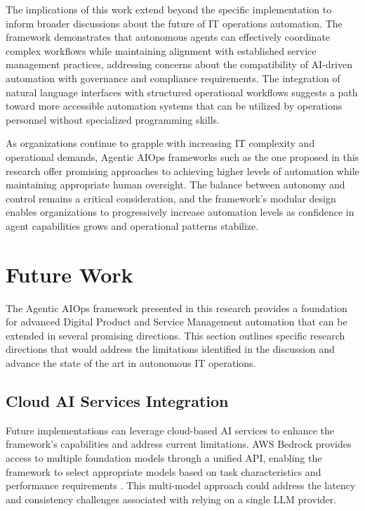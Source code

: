 \documentclass{article}
\begin{document}
The implications of this work extend beyond the specific implementation to inform broader discussions about the future of IT operations automation. The framework demonstrates that autonomous agents can effectively coordinate complex workflows while maintaining alignment with established service management practices, addressing concerns about the compatibility of AI-driven automation with governance and compliance requirements. The integration of natural language interfaces with structured operational workflows suggests a path toward more accessible automation systems that can be utilized by operations personnel without specialized programming skills.

As organizations continue to grapple with increasing IT complexity and operational demands, Agentic AIOps frameworks such as the one proposed in this research offer promising approaches to achieving higher levels of automation while maintaining appropriate human oversight. The balance between autonomy and control remains a critical consideration, and the framework's modular design enables organizations to progressively increase automation levels as confidence in agent capabilities grows and operational patterns stabilize.

\section{Future Work}

The Agentic AIOps framework presented in this research provides a foundation for advanced Digital Product and Service Management automation that can be extended in several promising directions. This section outlines specific research directions that would address the limitations identified in the discussion and advance the state of the art in autonomous IT operations.

\subsection{Cloud AI Services Integration}

Future implementations can leverage cloud-based AI services to enhance the framework's capabilities and address current limitations. AWS Bedrock provides access to multiple foundation models through a unified API, enabling the framework to select appropriate models based on task characteristics and performance requirements \cite{aws2024}. This multi-model approach could address the latency and consistency challenges associated with relying on a single LLM provider.
\end{document}
